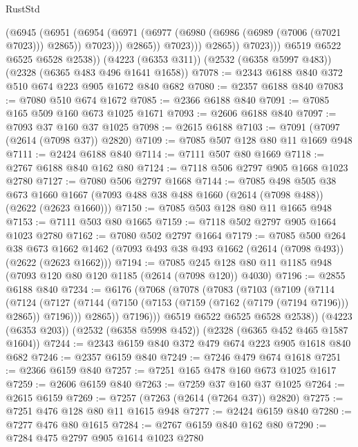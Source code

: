 \begin{lexlean}{RustStd}
\begin{coremodule}
                        (@6945
                          (@6951
                            (@6954
                              (@6971
                                (@6977 (@6980 (@6986 (@6989 (@7006 (@7021 @7023))) @2865)) @7023)))
                            @2865))
                        @7023)))
                  @2865))
              @7023)))
        @6519
        @6522
        @6525
        @6528
        @2538))
    (@4223 (@6353 @311))
    (@2532 (@6358 @5997 @483))
    (@2328 (@6365 @483 @496 @1641 @1658))
@7078 := @2343 @6188 @840 @372 @510 @674 @223 @905 @1672 @840 @682
@7080 := @2357 @6188 @840
@7083 := @7080 @510 @674 @1672
@7085 := @2366 @6188 @840
@7091 := @7085 @165 @509 @160 @673 @1025 @1671
@7093 := @2606 @6188 @840
@7097 := @7093 @37 @160 @37 @1025
@7098 := @2615 @6188
@7103 := @7091 (@7097 (@2614 (@7098 @37)) @2820)
@7109 := @7085 @507 @128 @80 @11 @1669 @948
@7111 := @2424 @6188 @840
@7114 := @7111 @507 @80 @1669
@7118 := @2767 @6188 @840 @162 @80
@7124 := @7118 @506 @2797 @905 @1668 @1023 @2780
@7127 := @7080 @506 @2797 @1668
@7144 := @7085
    @498
    @505
    @38
    @673
    @1660
    @1667
    (@7093 @488 @38 @488 @1660 (@2614 (@7098 @488)) (@2622 (@2623 @1660)))
@7150 := @7085 @503 @128 @80 @11 @1665 @948
@7153 := @7111 @503 @80 @1665
@7159 := @7118 @502 @2797 @905 @1664 @1023 @2780
@7162 := @7080 @502 @2797 @1664
@7179 := @7085
    @500
    @264
    @38
    @673
    @1662
    @1462
    (@7093 @493 @38 @493 @1662 (@2614 (@7098 @493)) (@2622 (@2623 @1662)))
@7194 := @7085 @245 @128 @80 @11 @1185 @948 (@7093 @120 @80 @120 @1185 (@2614 (@7098 @120)) @4030)
@7196 := @2855 @6188 @840
@7234 := @6176
    (@7068
      (@7078
        (@7083
          (@7103
            (@7109
              (@7114
                (@7124
                  (@7127 (@7144 (@7150 (@7153 (@7159 (@7162 (@7179 (@7194 @7196))) @2865)) @7196)))
                  @2865))
              @7196)))
        @6519
        @6522
        @6525
        @6528
        @2538))
    (@4223 (@6353 @203))
    (@2532 (@6358 @5998 @452))
    (@2328 (@6365 @452 @465 @1587 @1604))
@7244 := @2343 @6159 @840 @372 @479 @674 @223 @905 @1618 @840 @682
@7246 := @2357 @6159 @840
@7249 := @7246 @479 @674 @1618
@7251 := @2366 @6159 @840
@7257 := @7251 @165 @478 @160 @673 @1025 @1617
@7259 := @2606 @6159 @840
@7263 := @7259 @37 @160 @37 @1025
@7264 := @2615 @6159
@7269 := @7257 (@7263 (@2614 (@7264 @37)) @2820)
@7275 := @7251 @476 @128 @80 @11 @1615 @948
@7277 := @2424 @6159 @840
@7280 := @7277 @476 @80 @1615
@7284 := @2767 @6159 @840 @162 @80
@7290 := @7284 @475 @2797 @905 @1614 @1023 @2780

\end{coremodule}
\end{lexlean}
